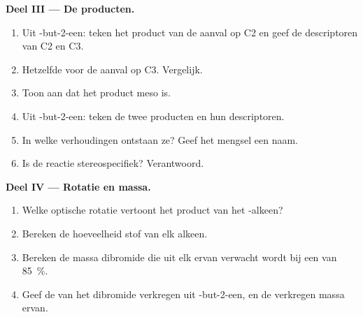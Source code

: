 \begin{problem}
\medskip
\noindent\textbf{Deel III --- De producten.}
\begin{enumerate}[resume]
  \item Uit -but-2-een: teken het product van de aanval op C2 en
        geef de descriptoren van C2 en C3.
  \item Hetzelfde voor de aanval op C3. Vergelijk.
  \item Toon aan dat het product meso is.
  \item Uit -but-2-een: teken de twee producten en hun
        descriptoren.
  \item In welke verhoudingen ontstaan ze? Geef het mengsel een naam.
  \item Is de reactie stereospecifiek? Verantwoord.
\end{enumerate}

\medskip
\noindent\textbf{Deel IV --- Rotatie en massa.}
\begin{enumerate}[resume]
  \item Welke optische rotatie vertoont het product van het
        -alkeen?
  \item Bereken de hoeveelheid stof van elk alkeen.
  \item Bereken de massa dibromide die uit elk ervan verwacht wordt bij
        een  van \qty{85}{\percent}.
  \item Geef de  van het dibromide verkregen uit
        -but-2-een, en de verkregen massa ervan.
\end{enumerate}
\end{problem}

